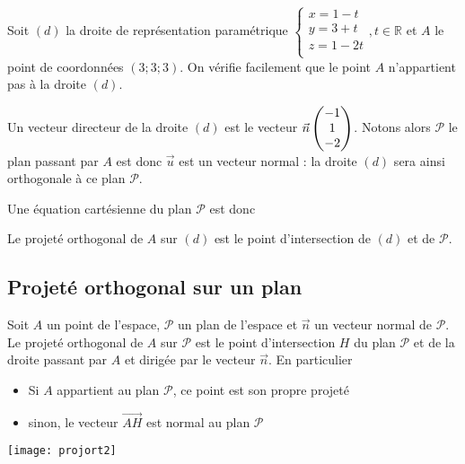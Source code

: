 \documentclass[11pt,fleqn, openany]{book} %
\begin{document}
\begin{example}Soit $(d)$ la droite de représentation paramétrique  $\left\{ \begin{array}{l}x=1-t \\ y=3+t \\ z = 1-2t \\\end{array}\right., t \in \mathbb{R}$ et $A$ le point de coordonnées $(3;3;3)$. On vérifie facilement que le point $A$ n'appartient pas à la droite $(d)$.

Un vecteur directeur de la droite $(d)$ est le vecteur $\vec n\renewcommand{\arraystretch}{1}\begin{pmatrix}-1\\1\\-2\end{pmatrix}$. Notons alors $\mathcal{P}$ le plan passant par $A$ est donc $\vec u$ est un vecteur normal : la droite $(d)$ sera ainsi orthogonale à ce plan $\mathcal{P}$. 

Une équation cartésienne du plan $\mathcal{P}$ est donc 

\vskip30pt

Le projeté orthogonal de $A$ sur $(d)$ est le point d'intersection de $(d)$ et de $\mathcal{P}$.

\vskip100pt \end{example}
\newpage

\subsection{Projeté orthogonal sur un plan}
\begin{definition}Soit $A$ un point de l'espace, $\mathcal{P}$ un plan de l'espace et $\vec n$ un vecteur normal de $\mathcal{P}$. Le projeté orthogonal de $A$ sur $\mathcal{P}$ est le point d'intersection $H$ du plan $\mathcal{P}$ et de la droite passant par $A$ et dirigée par le vecteur $\vec n$. En particulier
\begin{itemize}
\item Si $A$ appartient au plan $\mathcal{P}$, ce point est son propre projeté
\item sinon, le vecteur $\overrightarrow{AH}$ est normal au plan $\mathcal{P}$
\end{itemize}\end{definition}

\begin{center}
\texttt{[image: projort2]}
\end{center}
\end{document}
